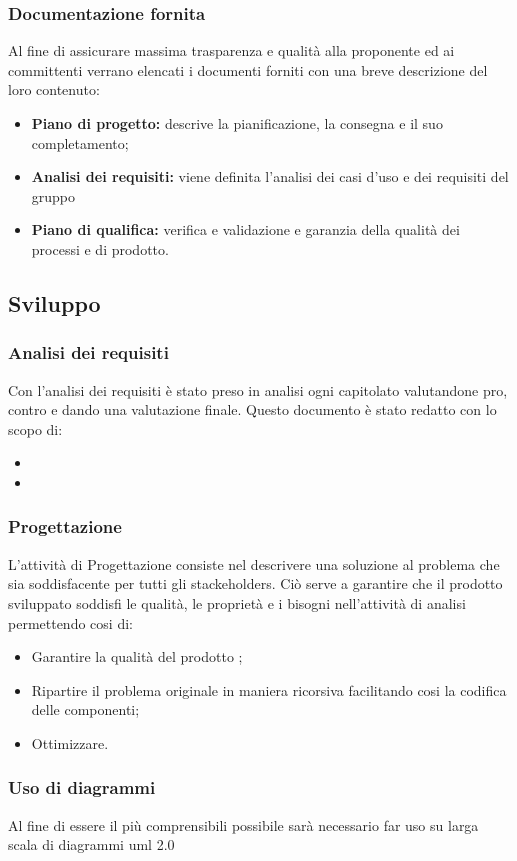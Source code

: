 \documentclass{article}
\begin{document}
    \subsubsection{Documentazione fornita}
    Al fine di assicurare massima trasparenza e qualità alla proponente ed ai committenti verrano elencati i documenti forniti con una breve descrizione del loro contenuto:
    \begin{itemize}
        \item \textbf{Piano di progetto:} descrive la pianificazione, la consegna e il suo completamento;
        \item \textbf{Analisi dei requisiti:} viene definita l'analisi dei casi d'uso e dei requisiti del gruppo
        \item \textbf{Piano di qualifica:} verifica e validazione e garanzia della qualità dei processi e di prodotto.
    \end{itemize}
    \subsection{Sviluppo}
    \subsubsection{Analisi dei requisiti}
    Con l'analisi dei requisiti è stato preso in analisi ogni capitolato valutandone pro, contro e dando una valutazione finale. Questo documento è stato redatto con lo scopo di:
    \begin{itemize}
        \item 
        \item 
    \end{itemize}
    \subsubsection{Progettazione}
    L'attività di Progettazione consiste nel descrivere una soluzione al problema che sia soddisfacente per tutti gli stackeholders. Ciò serve a garantire che il prodotto sviluppato soddisfi le qualità, le proprietà e i bisogni nell'attività di analisi permettendo cosi di:
    \begin{itemize}
        \item Garantire la qualità del prodotto ;
        \item Ripartire il problema originale in maniera ricorsiva facilitando cosi la codifica delle componenti;
        \item Ottimizzare.
    \end{itemize}	
    \subsubsection{Uso di diagrammi}
    Al fine di essere il più comprensibili possibile sarà necessario far uso su larga scala di diagrammi uml 2.0


\end{document}
